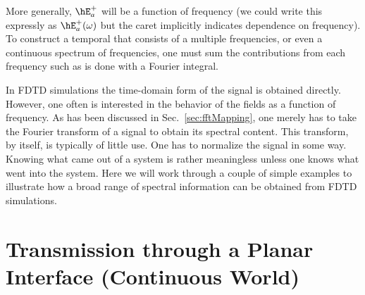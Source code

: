 More generally, $\hE_a^+$ will be a function of frequency (we could
write this expressly as $\hE_a^+(\omega)$ but the caret implicitly
indicates dependence on frequency).  To construct a temporal that
consists of a multiple frequencies, or even a continuous spectrum of
frequencies, one must sum the contributions from each frequency such
as is done with a Fourier integral.

In FDTD simulations the time-domain form of the signal is obtained
directly.  However, one often is interested in the behavior of the
fields as a function of frequency.  As has been discussed in Sec.\
\ref{sec:fftMapping}, one merely has to take the Fourier transform of
a signal to obtain its spectral content.  This transform, by itself,
is typically of little use.  One has to normalize the signal in some
way.  Knowing what came out of a system is rather meaningless unless
one knows what went into the system.  Here we will work through a
couple of simple examples to illustrate how a broad range of spectral
information can be obtained from FDTD simulations.

\section[Transmission through Planar Interface]{Transmission through a
Planar Interface (Continuous World) \label{sec:contTrans}}

